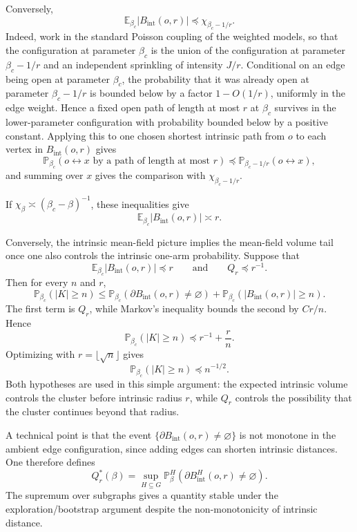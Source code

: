 \documentclass[11pt,reqno]{book}
\numberwithin{equation}{chapter}
\theoremstyle{plain}
\theoremstyle{definition}
\theoremstyle{remark}
\renewcommand{\P}{\mathbb P}
\newcommand{\E}{\mathbb E}
\newcommand{\1}{\mathbf 1}
\newcommand{\pre}{\preceq}
\begin{document}
Conversely,
\[
  \E_{\beta_c}|B_{\mathrm{int}}(o,r)|
  \pre
  \chi_{\beta_c-1/r}.
\]
Indeed, work in the standard Poisson coupling of the weighted models, so that the configuration at parameter \(\beta_c\) is the union of the configuration at parameter \(\beta_c-1/r\) and an independent sprinkling of intensity \(J/r\). Conditional on an edge being open at parameter \(\beta_c\), the probability that it was already open at parameter \(\beta_c-1/r\) is bounded below by a factor \(1-O(1/r)\), uniformly in the edge weight. Hence a fixed open path of length at most \(r\) at \(\beta_c\) survives in the lower-parameter configuration with probability bounded below by a positive constant. Applying this to one chosen shortest intrinsic path from \(o\) to each vertex in \(B_{\mathrm{int}}(o,r)\) gives
\[
  \P_{\beta_c}(o\leftrightarrow x\text{ by a path of length at most }r)
  \pre
  \P_{\beta_c-1/r}(o\leftrightarrow x),
\]
and summing over \(x\) gives the comparison with \(\chi_{\beta_c-1/r}\).

If $\chi_\beta\asymp(\beta_c-\beta)^{-1}$, these inequalities give
\[
  \E_{\beta_c}|B_{\mathrm{int}}(o,r)|\asymp r.
\]

Conversely, the intrinsic mean-field picture implies the mean-field volume tail once one also controls the intrinsic one-arm probability. Suppose that
\[
  \E_{\beta_c}|B_{\mathrm{int}}(o,r)|\pre r
  \qquad\text{and}\qquad
  Q_r\pre r^{-1}.
\]
Then for every \(n\) and \(r\),
\[
  \P_{\beta_c}(|K|\geq n)
  \leq
  \P_{\beta_c}(\partial B_{\mathrm{int}}(o,r)\neq\varnothing)
  +
  \P_{\beta_c}(|B_{\mathrm{int}}(o,r)|\geq n).
\]
The first term is \(Q_r\), while Markov's inequality bounds the second by \(Cr/n\). Hence
\[
  \P_{\beta_c}(|K|\geq n)\pre r^{-1}+\frac rn.
\]
Optimizing with \(r=\lfloor\sqrt n\rfloor\) gives
\[
  \P_{\beta_c}(|K|\geq n)\pre n^{-1/2}.
\]
Both hypotheses are used in this simple argument: the expected intrinsic volume controls the cluster before intrinsic radius \(r\), while \(Q_r\) controls the possibility that the cluster continues beyond that radius.

A technical point is that the event $\{\partial B_{\mathrm{int}}(o,r)\neq\varnothing\}$ is not monotone in the ambient edge configuration, since adding edges can shorten intrinsic distances. One therefore defines
\[
  Q_r^*(\beta)
  =
  \sup_{H\subseteq G}
  \P_\beta^H(\partial B_{\mathrm{int}}^H(o,r)\neq\varnothing).
\]
The supremum over subgraphs gives a quantity stable under the exploration/bootstrap argument despite the non-monotonicity of intrinsic distance.
\end{document}
